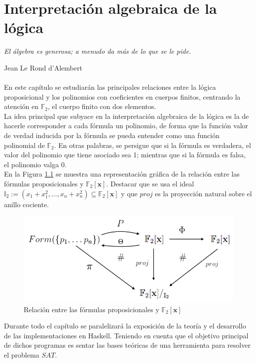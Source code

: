 \chapter{Interpretación algebraica de la lógica}\label{sec:interp}

\hfil \textit{El álgebra es generosa; a menudo da más de lo que se le pide.}

\hfil \hfil \hfil Jean Le Rond d'Alembert \\\\

En este capítulo se estudiarán las principales relaciones entre la lógica proposicional y los 
polinomios con coeficientes en cuerpos finitos, centrando la atención en $\mathbb{F}_2$, 
el cuerpo finito con dos elementos.\\

La idea principal que subyace en la interpretación algebraica de la lógica es la de hacerle corresponder a cada fórmula un polinomio, de forma que la función valor de verdad inducida por la fórmula se pueda entender como una función polinomial de $\mathbb{F}_2$. En otras palabras, se persigue que si la fórmula es verdadera, el valor del polinomio que tiene asociado sea 1; mientras que si la fórmula es falsa, el polinomio valga 0.\\

En la Figura \ref{fig:esquema} se muestra una representación gráfica de la relación entre las fórmulas proposicionales y $\mathbb{F}_2[\textbf{x}]$. Destacar que se usa el ideal $\mathbb{I}_2 :=(x_1+x_1^2,...,x_n+x_n^2)\subseteq\mathbb{F}_2[\textbf{x}]$ y que $proj$ es la proyección natural sobre el anillo cociente.

\begin{figure}[h]
	\centering
		\includegraphics[scale=0.46]{imagenes/conmu.png}
	\caption{Relación entre las fórmulas proposicionales y $\mathbb{F}_2[\textbf{x}]$}
	\label{fig:esquema}
\end{figure}

Durante todo el capítulo se paralelizará la exposición de la teoría y el desarrollo de las implementaciones en Haskell. Teniendo en cuenta que el objetivo principal de dichos programas es sentar las bases teóricas de una herramienta para resolver el problema $SAT$.
 
